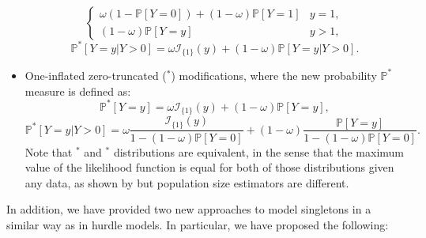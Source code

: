 \documentclass[
]{jss}
\newcommand{\1}{\mathcal{I}} \newcommand{\bZero}{\boldsymbol{0}}
\begin{document}
\begin{itemize}
\begin{equation*}
\begin{cases}
    \omega\left(1-\mathbb{P}[Y=0]\right)+(1-\omega)\mathbb{P}[Y=1] & y=1, \\
    (1-\omega)\mathbb{P}[Y=y] & y>1,
    \end{cases}
    \end{equation*}
    \begin{equation*}
        \mathbb{P}^{\ast}[Y=y|Y>0]=\omega\mathcal{I}_{\{1\}}(y)+(1-\omega)\mathbb{P}[Y=y|Y>0].
    \end{equation*}
    \item One-inflated zero-truncated ($^\ast$) modifications, where the new probability $\mathbb{P}^{\ast}$ measure is defined as:
    \begin{equation*}
        \mathbb{P}^{\ast}[Y=y] = \omega \mathcal{I}_{\{1\}}(y)+(1-\omega)\mathbb{P}[Y=y],
    \end{equation*}
    \begin{equation*}
        \mathbb{P}^{\ast}[Y=y|Y>0] = 
        \omega\frac{\mathcal{I}_{\{1\}}(y)}{1-(1-\omega)\mathbb{P}[Y=0]}+
        (1-\omega)\frac{\mathbb{P}[Y=y]}{1-(1-\omega)\mathbb{P}[Y=0]}.
    \end{equation*}
    Note that $^\ast$ and $^\ast$ distributions are equivalent, in the sense that the maximum value of the likelihood function is equal for both of those distributions given any data, as shown by \cite{bohning2023equivalence} but population size estimators are different.
\end{itemize}

In addition, we have provided two new approaches to model singletons in
a similar way as in hurdle models. In particular, we have proposed the
following:
\end{document}
